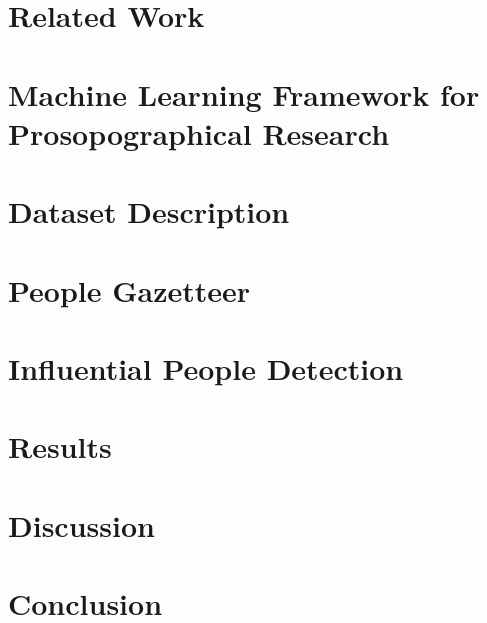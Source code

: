 \documentclass[10pt,journal,compsoc]{IEEEtran}
\begin{document}
%

\renewcommand{\thetable}{\Roman{table}}
\renewcommand{\thefigure}{\arabic{figure}}


\section{Related Work}
\label{influential:rw}


\section{Machine Learning Framework for Prosopographical Research}
\label{chp:framework}


\section{Dataset Description}
\label{data}


\section{People Gazetteer}
\label{chapter:people gazetteer}


\section{Influential People Detection}
\label{influential}


\section{Results}
\label{influential:results}


\section{Discussion}
\label{influential:discussion}


\section{Conclusion}
\label{conc}


\end{document}
